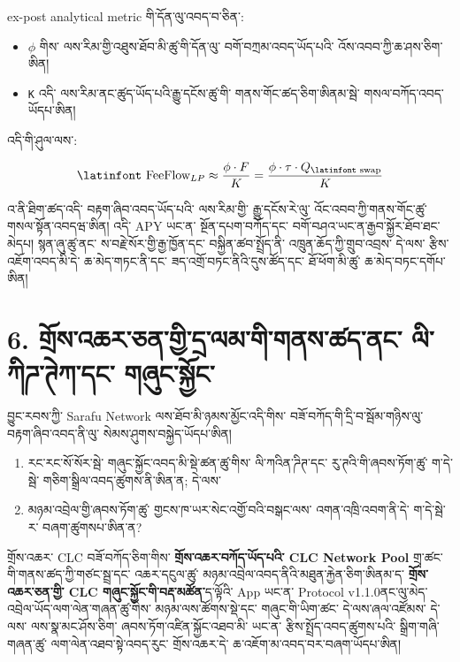 \documentclass[11pt]{article}
\begin{document}
ex-post analytical metric གི་དོན་ལུ་འབད་བ་ཅིན་:

\begin{itemize}[leftmargin=*]
\item \texttt{$\phi$} གིས་ ལས་རིམ་གྱི་འཐུས་ཐོབ་མི་ཚུ་གི་དོན་ལུ་ བགོ་བཀྲམ་འབད་ཡོད་པའི་ འོས་འབབ་ཀྱི་ཆ་ཤས་ཅིག་ཨིན།
\item \texttt{K} འདི་ ལས་རིམ་ནང་ཚུད་ཡོད་པའི་རྒྱུ་དངོས་ཚུ་གི་ གནས་གོང་ཚད་ཅིག་ཨིནམ་སྦེ་ གསལ་བཀོད་འབད་ཡོདཔ་ཨིན།
\end{itemize}
འདི་གི་ཤུལ་ལས་:

\[
\text{\latinfont FeeFlow}_{LP} \approx \frac{\phi \cdot F}{K} = \frac{\phi \cdot \tau \cdot Q_{\text{\latinfont swap}}}{K}
\]

འ་ནི་ཐིག་ཚད་འདི་ བརྟག་ཞིབ་འབད་ཡོད་པའི་ ལས་རིམ་གྱི་ རྒྱུ་དངོས་རེ་ལུ་ འོང་འབབ་ཀྱི་གནས་གོང་ཚུ་ གསལ་སྟོན་འབདཝ་ཨིན། འདི་ APY ཡང་ན་ སྔོན་དཔག་བཀོད་དང་ བགོ་བཤའ་ཡང་ན་རྒྱབ་སྐྱོར་ཐོབ་ཐང་མེདཔ། སྙན་ཞུ་ཚུ་ནང་ ས་བརྗེ་སོར་གྱི་རྒྱ་ཁྱོན་དང་ བསྐྱིན་ཚབ་སྤྲོད་ནི་ འཁྲུན་ཆོད་ཀྱི་གྲུབ་འབྲས་ དེ་ལས་ རྩིས་འཇོག་འབད་མི་དེ་ ཆ་མེད་གཏང་ནི་དང་ ཟད་འགྲོ་བཏང་ནིའི་དུས་ཚོད་དང་ ཐོ་ཕོག་མི་ཚུ་ ཆ་མེད་བཏང་དགོཔ་ཨིན།


\section*{6. གྲོས་འཆར་ཅན་གྱི་དྲ་ལམ་གི་གནས་ཚད་ནང་ ལི་ཀིཌ་ཊེཀ་དང་ གཞུང་སྐྱོང་}

བྱུང་རབས་ཀྱི་ Sarafu Network ལས་ཐོབ་མི་ཉམས་མྱོང་འདི་གིས་ བཟོ་བཀོད་གི་དྲི་བ་སྦོམ་གཉིས་ལུ་ བརྟག་ཞིབ་འབད་ནི་ལུ་ སེམས་ཤུགས་བསྐྱེད་ཡོདཔ་ཨིན།

\begin{enumerate}[leftmargin=*]
\item རང་རང་སོ་སོར་སྦེ་ གཞུང་སྐྱོང་འབད་མི་སྡེ་ཚན་ཚུ་གིས་ ལི་ཀའིན་ཌིཊ་དང་ རུ་ཊའི་གི་ཞབས་ཏོག་ཚུ་ ག་དེ་སྦེ་ གཅིག་སྒྲིལ་འབད་ཚུགས་ནི་ཨིན་ན; དེ་ལས་
\item མཉམ་འབྲེལ་གྱི་ཞབས་ཏོག་ཚུ་ གྱངས་ཁ་ཡར་སེང་འགྱོ་བའི་བསྒང་ལས་ འགན་འཁྲི་འབག་ནི་དེ་ ག་དེ་སྦེ་ར་ བཞག་ཚུགསཔ་ཨིན་ན?
\end{enumerate}
གྲོས་འཆར་ CLC བཟོ་བཀོད་ཅིག་གིས་ \textbf{གྲོས་འཆར་བཀོད་ཡོད་པའི་ CLC Network Pool} གྲྭ་ཚང་གི་གནས་ཚད་ཀྱི་གཙང་སྦྲ་དང་ འཆར་དངུལ་ཚུ་ མཉམ་འབྲེལ་འབད་ནིའི་མཐུན་རྐྱེན་ཅིག་ཨིནམ་ད་ \textbf{ གྲོས་འཆར་ཅན་གྱི་ CLC གཞུང་སྐྱོང་གི་བརྡ་མཚོན་}ད་ལྟོའི་ App ཡང་ན་ Protocol v1.1.0ནང་ལུ་མེད་ འབྲེལ་ཡོད་ལག་ལེན་གཞན་ཚུ་གིས་ མཉམ་ལས་ཚོགས་སྡེ་དང་ གཞུང་གི་ཡིག་ཚང་ དེ་ལས་ཞལ་འཛོམས་ དེ་ལས་ ལས་སྣ་མང་ཤོས་ཅིག་ ཞབས་ཏོག་འཛིན་སྐྱོང་འཐབ་མི་ ཡང་ན་ རྩིས་སྤྲོད་འབད་ཚུགས་པའི་ སྒྲིག་གཞི་གཞན་ཚུ་ ལག་ལེན་འཐབ་སྟེ་འབད་རུང་ གྲོས་འཆར་དེ་ ཆ་འཇོག་མ་འབད་བར་བཞག་ཡོདཔ་ཨིན།
\end{document}
